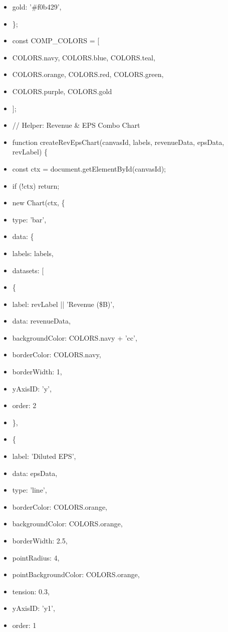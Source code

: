 \documentclass[11pt]{article}
\begin{document}
\begin{itemize}[leftmargin=*,itemsep=2pt,topsep=2pt]
\item {} gold: '\#f0b429',
\item {} \};
\item {} const COMP\_\allowbreak{}COLORS = [
\item {} COLORS.navy, COLORS.blue, COLORS.teal,
\item {} COLORS.orange, COLORS.red, COLORS.green,
\item {} COLORS.purple, COLORS.gold
\item {} ];
\item {} // Helper: Revenue \& EPS Combo Chart
\item {} function createRevEpsChart(canvasId, labels, revenueData, epsData, revLabel) \{
\item {} const ctx = document.getElementById(canvasId);
\item {} if (!ctx) return;
\item {} new Chart(ctx, \{
\item {} type: 'bar',
\item {} data: \{
\item {} labels: labels,
\item {} datasets: [
\item {} \{
\item {} label: revLabel || 'Revenue (\$B)',
\item {} data: revenueData,
\item {} backgroundColor: COLORS.navy + 'cc',
\item {} borderColor: COLORS.navy,
\item {} borderWidth: 1,
\item {} yAxisID: 'y',
\item {} order: 2
\item {} \},
\item {} \{
\item {} label: 'Diluted EPS',
\item {} data: epsData,
\item {} type: 'line',
\item {} borderColor: COLORS.orange,
\item {} backgroundColor: COLORS.orange,
\item {} borderWidth: 2.5,
\item {} pointRadius: 4,
\item {} pointBackgroundColor: COLORS.orange,
\item {} tension: 0.3,
\item {} yAxisID: 'y1',
\item {} order: 1

\end{itemize}
\end{document}
